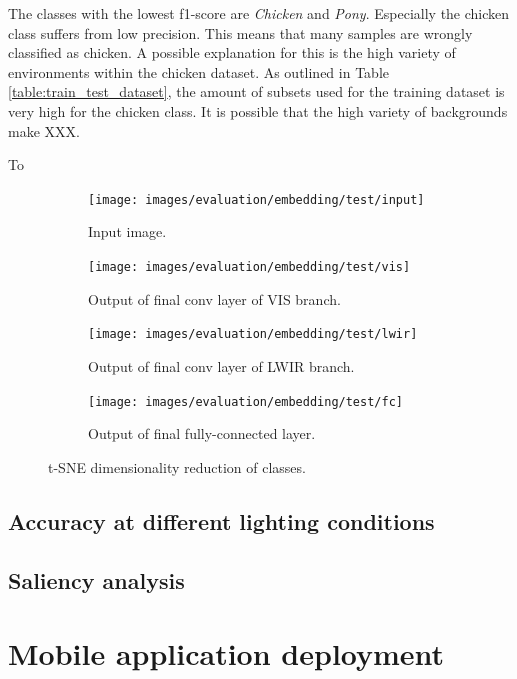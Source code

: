 \documentclass{l4proj}
\begin{document}
The classes with the lowest f1-score are \textit{Chicken} and \textit{Pony}. Especially the chicken class suffers from low precision. This means that many samples are wrongly classified as chicken. A possible explanation for this is the high variety of environments within the chicken dataset. As outlined in Table \ref{table:train_test_dataset}, the amount of subsets used for the training dataset is very high for the chicken class. It is possible that the high variety of backgrounds make XXX.

To 

\begin{figure}[ht]
  \centering
  \begin{subfigure}[h!]{0.4\textwidth}
    \texttt{[image: images/evaluation/embedding/test/input]}
    \caption{Input image.}
  \end{subfigure}
  \quad
  \begin{subfigure}[h!]{0.4\textwidth}
    \texttt{[image: images/evaluation/embedding/test/vis]}
    \caption{Output of final conv layer of VIS branch.}
  \end{subfigure}

  \begin{subfigure}[h!]{0.4\textwidth}
    \texttt{[image: images/evaluation/embedding/test/lwir]}
    \caption{Output of final conv layer of LWIR branch.}
  \end{subfigure}
  \quad
  \begin{subfigure}[h!]{0.4\textwidth}
    \texttt{[image: images/evaluation/embedding/test/fc]}
    \caption{Output of final fully-connected layer.}
  \end{subfigure}
  \caption{t-SNE dimensionality reduction of classes.}
  \label{fig:test_tsne}
\end{figure}


\subsection{Accuracy at different lighting conditions}

\subsection{Saliency analysis}


\section{Mobile application deployment}
\end{document}
